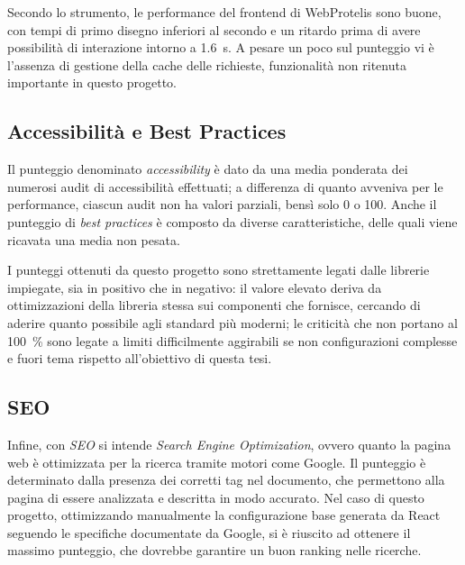       Secondo lo strumento, le performance %
      del frontend di WebProtelis sono buone, con tempi di primo disegno inferiori al secondo e un ritardo prima di avere possibilità di interazione intorno a \SI{1.6}{\second}.
      A pesare un poco sul punteggio vi è l'assenza di gestione della cache delle richieste, funzionalità non ritenuta importante in questo progetto.

    \subsection{Accessibilità e Best Practices}

    Il punteggio denominato \emph{accessibility} è dato da una media ponderata dei numerosi audit di accessibilità effettuati;
    a differenza di quanto avveniva per le performance, ciascun audit non ha valori parziali, bensì solo 0 o 100.
    Anche il punteggio di \emph{best practices} è composto da diverse caratteristiche, delle quali viene ricavata una media non pesata.

    I punteggi ottenuti da questo progetto sono strettamente legati dalle librerie impiegate, sia in positivo che in negativo:
    il valore elevato deriva da ottimizzazioni della libreria stessa sui componenti che fornisce, cercando di aderire quanto possibile agli standard più moderni;
    le criticità che non portano al \SI{100}{\percent} sono legate a limiti difficilmente aggirabili se non configurazioni complesse e fuori tema rispetto all'obiettivo di questa tesi.

    \subsection{SEO}

    Infine, con \emph{SEO} si intende \emph{\emph{S}earch \emph{E}ngine \emph{O}ptimization}, ovvero quanto la pagina web è ottimizzata per la ricerca tramite motori come Google.
    Il punteggio è determinato dalla presenza dei corretti tag nel documento, che permettono alla pagina di essere analizzata e descritta in modo accurato.
    Nel caso di questo progetto, ottimizzando manualmente la configurazione base generata da React seguendo le specifiche documentate da Google, si è riuscito ad ottenere il massimo punteggio, che dovrebbe garantire un buon ranking nelle ricerche.


